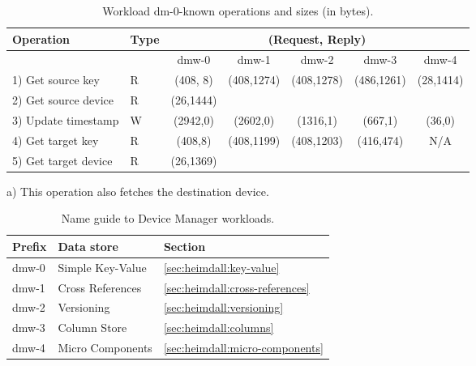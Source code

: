 \begin{table}[ht]
\small
\centering
\begin{threeparttable}
\begin{tabular}{ll ccccc}
 Operation & Type &  \multicolumn{5}{c}{ (Request, Reply) } \\  \midrule
&  & dmw-0 & dmw-1  & dmw-2 & dmw-3 & dmw-4 \\ \toprule 
1) Get source key & R &(408, 8) & \multirow{2}{*}{(408,1274)} &
\multirow{2}{*}{(408,1278)} & \multirow{2}{*}{(486,1261)} &
\multirow{2}{*}{(28,1414)} \tnote{a} \\ \cmidrule{1-2}
2) Get source device & R & (26,1444) & & & & \\ \midrule
3) Update timestamp & W & (2942,0) & (2602,0) & (1316,1) & (667,1) & 
(36,0) \\ \midrule
4) Get target key & R & (408,8) & \multirow{2}{*}[-1mm]{(408,1199)} &
\multirow{2}{*}[-1mm]{(408,1203)} & \multirow{2}{*}[-1mm]{(416,474)} &
\multirow{2}{*}[-1mm]{N/A} \\ \cmidrule{1-2}
5) Get target device & R & (26,1369) &  &
 & & \\\bottomrule
\end{tabular}
\caption[Workload dm-0-known operations]{Workload
  dm-0-known  operations and sizes (in bytes).}\label{table:dm-known-optimizations}
\begin{tablenotes}
\item [a)] This operation also fetches the destination device.
\end{tablenotes}
\end{threeparttable}
\end{table}

\begin{table}[ht]
\small
\begin{tabular}{lll} 
    Prefix &  Data store & Section\\\toprule
    dmw-0 & Simple Key-Value  & \ref{sec:heimdall:key-value}  \\
    dmw-1 & Cross References  & \ref{sec:heimdall:cross-references} \\
    dmw-2 & Versioning & \ref{sec:heimdall:versioning} \\
    dmw-3 & Column Store & \ref{sec:heimdall:columns} \\
    dmw-4 & Micro Components & \ref{sec:heimdall:micro-components} \\  \bottomrule
  \end{tabular}
  \caption[Name guide to Device Manager workloads]{Name guide to
    Device Manager workloads.}
  \label{table:names:dm}
\end{table}


